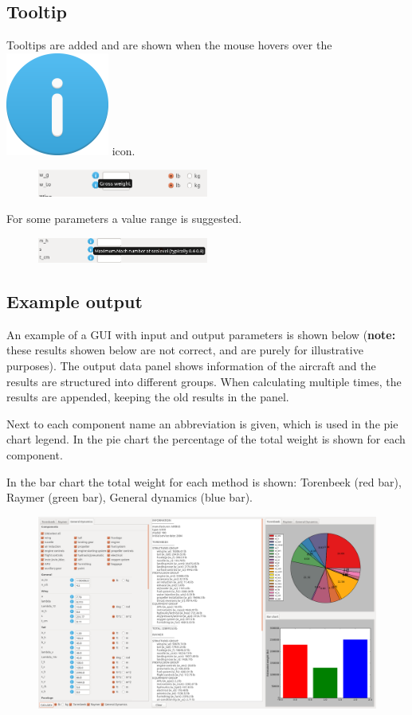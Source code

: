 \clearpage
\subsection{Tooltip}
\noindent Tooltips are added and are shown when the mouse hovers over the \includegraphics[scale=0.08]{image/icon.png} icon.
\begin{figure}[ht]
\includegraphics[width=0.5\textwidth]{image/gui_tooltip.png}
\end{figure}

\noindent For some parameters a value range is suggested.
\begin{figure}[h]
\includegraphics[width=0.5\textwidth]{image/gui_tooltip_typically.png}
\end{figure}

\subsection{Example output}
\noindent An example of a GUI with input and output parameters is shown below (\textbf{note:} these results showen below are not correct, and are purely for illustrative purposes).
The output data panel shows information of the aircraft and the results are structured into different groups.
When calculating multiple times, the results are appended, keeping the old results in the panel.

Next to each component name an abbreviation is given, which is used in the pie chart legend. In the pie chart the percentage of the total weight is shown for each component.

In the bar chart the total weight for each method is shown: Torenbeek (red bar), Raymer (green bar), General dynamics (blue bar).

\begin{figure}[ht]
\includegraphics[width=1\textwidth]{image/gui_output.png}
\end{figure}
